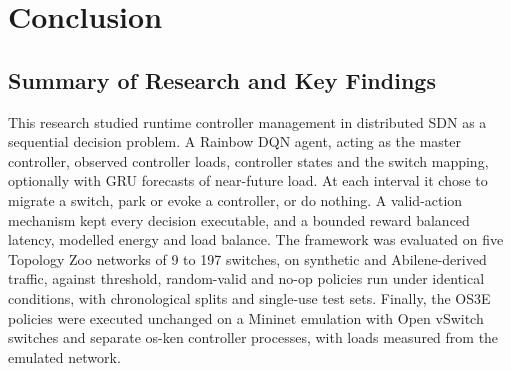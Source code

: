 \chapter{Conclusion}
\label{ch:conclusion}

\section{Summary of Research and Key Findings}

This research studied runtime controller management in distributed SDN as a sequential decision problem. A Rainbow DQN agent, acting as the master controller, observed controller loads, controller states and the switch mapping, optionally with GRU forecasts of near-future load. At each interval it chose to migrate a switch, park or evoke a controller, or do nothing. A valid-action mechanism kept every decision executable, and a bounded reward balanced latency, modelled energy and load balance. The framework was evaluated on five Topology Zoo networks of 9 to 197 switches, on synthetic and Abilene-derived traffic, against threshold, random-valid and no-op policies run under identical conditions, with chronological splits and single-use test sets. Finally, the OS3E policies were executed unchanged on a Mininet emulation with Open vSwitch switches and separate os-ken controller processes, with loads measured from the emulated network.

